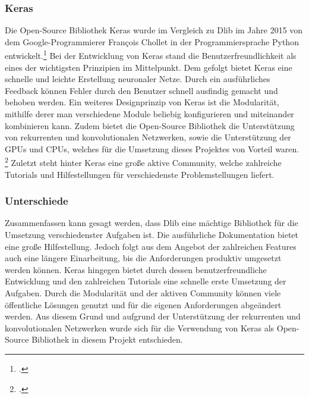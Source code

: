 \documentclass[12pt, a4paper]{scrbook}
\begin{document}
\subsubsection{Keras}
Die Open-Source Bibliothek Keras wurde im Vergleich zu Dlib im Jahre 2015 von dem Google-Programmierer François Chollet in der Programmiersprache Python entwickelt.\footcite[Vgl.]{Keras}
Bei der Entwicklung von Keras stand die Benutzerfreundlichkeit als eines der wichtigsten Prinzipien im Mittelpunkt. Dem gefolgt bietet Keras eine schnelle und leichte Erstellung neuronaler Netze. Durch ein ausführliches Feedback können Fehler durch den Benutzer schnell ausfindig gemacht und behoben werden. Ein weiteres Designprinzip von Keras ist die Modularität, mithilfe derer man verschiedene Module beliebig konfigurieren und miteinander kombinieren kann. Zudem bietet die Open-Source Bibliothek die Unterstützung von rekurrenten und konvolutionalen Netzwerken, sowie die Unterstützung der GPUs und CPUs, welches für die Umsetzung dieses Projektes von Vorteil waren.
\footcite[Vgl.]{Keras2}
Zuletzt steht hinter Keras eine große aktive Community, welche zahlreiche Tutorials und Hilfestellungen für verschiedenste Problemstellungen liefert.


\subsubsection{Unterschiede}

Zusammenfassen kann gesagt werden, dass Dlib eine mächtige Bibliothek für die Umsetzung verschiedenster Aufgaben ist. Die ausführliche Dokumentation bietet eine große Hilfestellung. Jedoch folgt aus dem Angebot der zahlreichen Features auch eine längere Einarbeitung, bis die Anforderungen produktiv umgesetzt werden können. 
\newline
Keras hingegen bietet durch dessen benutzerfreundliche Entwicklung und den zahlreichen Tutorials eine schnelle erste Umsetzung der Aufgaben. Durch die Modularität und der aktiven Community können viele öffentliche Lösungen genutzt und für die eigenen Anforderungen abgeändert werden. 
Aus diesem Grund und aufgrund der Unterstützung der rekurrenten und konvolutionalen Netzwerken wurde sich für die Verwendung von Keras als Open-Source Bibliothek in diesem Projekt entschieden.
\end{document}
